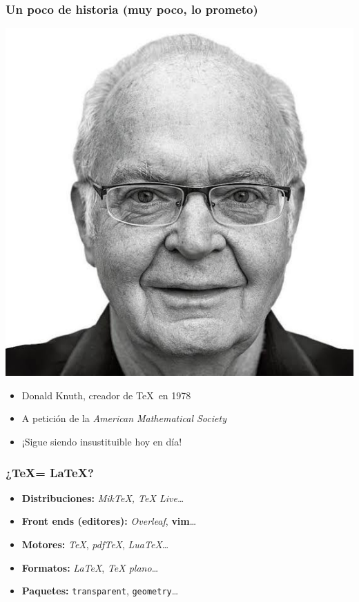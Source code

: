 \begin{frame}
    \frametitle{Un poco de historia (muy poco, lo prometo)}
    \begin{minipage}[c]{0.45\textwidth}
        \includegraphics[width=\textwidth]{images/knuth.jpeg}
    \end{minipage}
    \hfill
    \begin{minipage}[c]{0.45\textwidth}
        \begin{itemize}
            \item{Donald Knuth, creador de \TeX\ en 1978}
            \item{A petición de la \emph{American Mathematical Society}}
            \item{¡Sigue siendo insustituible hoy en día!}
        \end{itemize}
    \end{minipage}
\end{frame}

\begin{frame}
\frametitle{¿\TeX = \LaTeX?}
\begin{itemize}
    \item{\textbf{Distribuciones:} \emph{MikTeX, TeX Live\dots}}
    \item{\textbf{Front ends (editores):} \emph{Overleaf}, \textbf{vim}\dots}
    \item{\textbf{Motores:} \emph{TeX}, \emph{pdfTeX}, \emph{LuaTeX}\dots}
    \item{\textbf{Formatos:} \emph{LaTeX}, \emph{TeX plano}\dots}
    \item{\textbf{Paquetes:} \texttt{transparent}, \texttt{geometry}\dots}
\end{itemize}
\end{frame}
